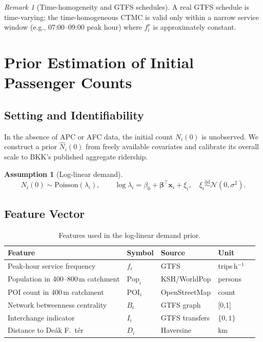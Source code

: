 \documentclass[12pt,a4paper]{article}
\theoremstyle{plain}
\theoremstyle{definition}
\newtheorem{assumption}[theorem]{Assumption}
\theoremstyle{remark}
\newtheorem{remark}[theorem]{Remark}
\begin{document}
\begin{remark}[Time-homogeneity and GTFS schedules]
A real GTFS schedule is time-varying; the time-homogeneous CTMC is valid only
within a narrow service window (e.g., 07:00--09:00 peak hour) where $f^v_i$
is approximately constant.
\end{remark}

\section{Prior Estimation of Initial Passenger Counts}
\label{sec:prior}

\subsection{Setting and Identifiability}

In the absence of APC or AFC data, the initial count $N_i(0)$ is unobserved.
We construct a prior $\hat{N}_i(0)$ from freely available covariates and
calibrate its overall scale to BKK's published aggregate ridership.

\begin{assumption}[Log-linear demand]
\begin{equation}
  N_i(0)\sim\mathrm{Poisson}(\lambda_i),\qquad
  \log\lambda_i = \beta_0+\boldsymbol{\beta}^\top\mathbf{x}_i+\xi_i,\quad
  \xi_i\overset{\mathrm{iid}}{\sim}\mathcal{N}(0,\sigma^2).
  \label{eq:loglinear}
\end{equation}
\end{assumption}

\subsection{Feature Vector}

\begin{table}[htbp]
\centering
\small
\begin{tabular}{lllll}
\toprule
Feature & Symbol & Source & Unit \\
\midrule
Peak-hour service frequency     & $f_i$       & GTFS             & trips\,h$^{-1}$ \\
Population in 400--800\,m catchment & $\mathrm{Pop}_i$ & KSH/WorldPop & persons \\
POI count in 400\,m catchment   & $\mathrm{POI}_i$ & OpenStreetMap  & count \\
Network betweenness centrality  & $B_i$       & GTFS graph       & [0,1] \\
Interchange indicator           & $I_i$       & GTFS transfers   & $\{0,1\}$ \\
Distance to De\'ak F.\ t\'er   & $D_i$       & Haversine        & km \\
\bottomrule
\end{tabular}
\caption{Features used in the log-linear demand prior.}
\label{tab:features}
\end{table}
\end{document}
